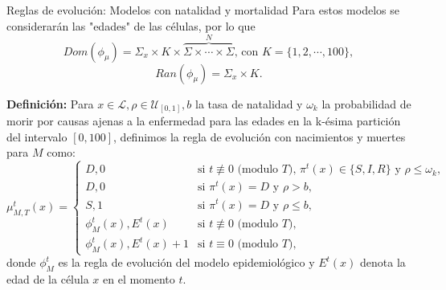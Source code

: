 \documentclass[9pt]{beamer}
\begin{document}
\begin{frame}{Reglas de evolución: Modelos con natalidad y mortalidad}
Para estos modelos se considerarán las "edades" de las células, por lo que
$$Dom(\phi_\mu)=\Sigma_x\times K\times\overbrace{\Sigma\times\cdots\times\Sigma}^N\text{, con }K=\{1,2,\cdots,100\},$$
$$Ran(\phi_\mu)=\Sigma_x\times K.$$

\textbf{Definición:} Para $x\in\mathcal{L},\rho\in\mathcal{U}_{[0,1]},b$ la tasa de natalidad y $\omega_k$ la probabilidad de morir por causas ajenas a la enfermedad para las edades en la k-ésima partición del intervalo $[0,100]$, definimos la regla de evolución con nacimientos y muertes para $M$ como:
\begin{equation*}
    \mu_{M,T}^t(x)=\left\{\begin{array}{ll}
        D,0 & \text{si }t\not\equiv 0 \text{ (modulo }T\text{), }\pi^t(x)\in\{S,I,R\}\text{ y }\rho\leq\omega_k, \\
        D,0 & \text{si }\pi^t(x)=D\text{ y }\rho>b,\\
        S,1 & \text{si }\pi^t(x)=D\text{ y }\rho\leq b,\\
        \phi_M^t(x),E^t(x) & \text{si }t\not\equiv 0 \text{ (modulo }T),\\
        \phi_M^t(x),E^t(x)+1 & \text{si }t\equiv 0 \text{ (modulo }T),
    \end{array}\right.
\end{equation*}
donde $\phi_M^t$ es la regla de evolución del modelo epidemiológico y $E^t(x)$ denota la edad de la célula $x$ en el momento $t$.
\end{frame}


\end{document}
